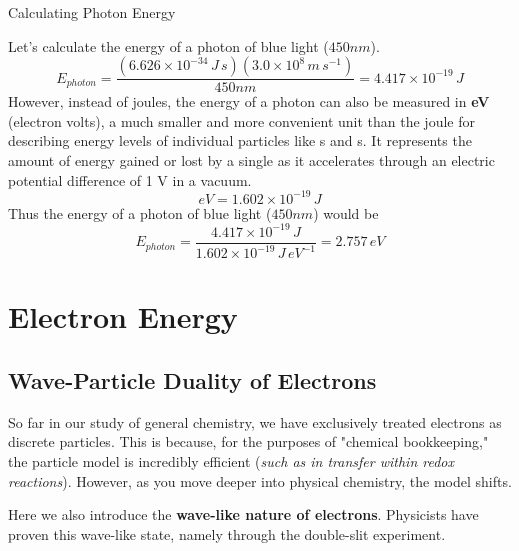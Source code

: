 \documentclass[10pt]{article}
\begin{document}
    \begin{core}{Calculating Photon Energy}

      Let's calculate the energy of a photon of blue light ($450nm$).
      \[
        E_{photon} = \frac{(6.626 \times 10^{-34}\,J\,s)(3.0 \times 10^8\,m\,s^{-1})}{450nm} = 4.417 \times 10^{-19}\,J
      \]
      However, instead of joules, the energy of a photon can also be measured in \textbf{eV} (electron volts), a much smaller and more convenient unit than the joule for describing energy levels of individual particles like s and s. It represents the amount of energy gained or lost by a single  as it accelerates through an electric potential difference of 1 V in a vacuum.
      \[
        eV = 1.602 \times 10^{-19}\,J
      \]
      Thus the energy of a photon of blue light ($450nm$) would be
      \[
        E_{photon} = \frac{4.417 \times 10^{-19}\,J}{1.602 \times 10^{-19}\,J\,eV^{-1}} = 2.757\,eV
      \]
      
    \end{core}

\section{Electron Energy}

  \subsection{Wave-Particle Duality of Electrons}

    So far in our study of general chemistry, we have exclusively treated electrons as discrete particles. This is because, for the purposes of "chemical bookkeeping," the particle model is incredibly efficient (\textit{such as in  transfer within redox reactions}). However, as you move deeper into physical chemistry, the model shifts.

    Here we also introduce the \textbf{wave-like nature of electrons}. Physicists have proven this wave-like state, namely through the double-slit experiment.
\end{document}
